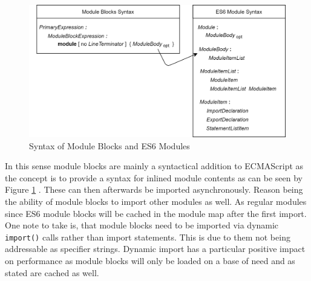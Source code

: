 \begin{figure}[h!]
    \centering
    \includegraphics[scale=0.165]{figures/ModuleSyntax.png}
    \caption{Syntax of Module Blocks and ES6 Modules}
    \label{fig:mbSyn}
\end{figure}

In this sense module blocks are mainly a syntactical addition to ECMAScript as the concept is to provide a syntax for inlined module contents as can be seen by Figure \ref{fig:mbSyn} \cite{gitMB, ecma}. These can then afterwards be imported asynchronously. Reason being the ability of module blocks to import other modules as well. As regular modules since ES6 module blocks will be cached in the module map after the first import. One note to take is, that module blocks need to be imported via dynamic \texttt{import()} calls rather than import statements. This is due to them not being addressable as specifier strings. Dynamic import  has a particular positive impact on performance as module blocks will only be loaded on a base of need and as stated are cached as well.
